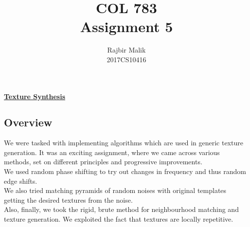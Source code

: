 \documentclass{article}
\title{COL 783 \\ Assignment 5}
\author{Rajbir Malik \\ 2017CS10416}
\begin{document}
    
    \maketitle

    \begin{center}
    \Large{\underline{\textbf{Texture Synthesis}}}
    \end{center}
    \subsection*{Overview}
    We were tasked with implementing algorithms which are used in generic texture generation. It was an exciting assignment, where we came across various methods, set on different principles and progressive improvements.\\
    We used random phase shifting to try out changes in frequency and thus random edge shifts.\\
    We also tried matching pyramids of random noises with original templates getting the desired textures from the noise.\\
    Also, finally, we took the rigid, brute method for neighbourhood matching and texture generation. We exploited the fact that textures are locally repetitive.
    \pagebreak
\end{document}
